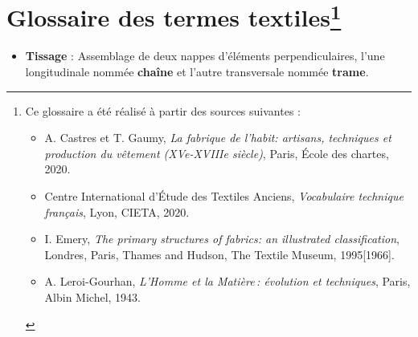 \chapter*{Glossaire des termes textiles\footnote{Ce glossaire a été réalisé à partir des sources suivantes : \begin{itemize} \item A. Castres et T. Gaumy, \textit{La fabrique de l'habit: artisans, techniques et production du vêtement (XVe-XVIIIe siècle)}, Paris, École des chartes, 2020. \item Centre International d'Étude des Textiles Anciens, \textit{Vocabulaire technique français}, Lyon, CIETA, 2020. \item I. Emery, \textit{The primary structures of fabrics: an illustrated classification}, Londres, Paris, Thames and Hudson, The Textile Museum, 1995[1966]. \item A. Leroi-Gourhan, \textit{L'Homme et la Matière : évolution et techniques}, Paris, Albin Michel, 1943. \end{itemize} }}

\begin{itemize}
	\item \textbf{Tissage} : Assemblage de deux nappes d'éléments perpendiculaires, l'une longitudinale nommée \textbf{chaîne} et l'autre transversale nommée \textbf{trame}. 
\end{itemize}

\vspace{10pt}

